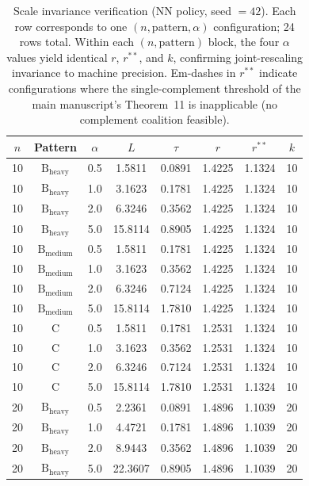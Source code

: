 \documentclass[11pt]{article}
\begin{document}
\begin{table}[htbp]
\centering
\footnotesize
\caption{Scale invariance verification (NN policy, seed $=42$). Each row corresponds to one $(n,\text{pattern},\alpha)$ configuration; 24 rows total. Within each $(n,\text{pattern})$ block, the four $\alpha$ values yield identical $r$, $r^{\ast\ast}$, and $k$, confirming joint-rescaling invariance to machine precision. Em-dashes in $r^{\ast\ast}$ indicate configurations where the single-complement threshold of the main manuscript's Theorem~11 is inapplicable (no complement coalition feasible).}
\label{tab:scale-invariance}
\begin{tabular}{@{}cccccccc@{}}
\toprule
$n$ & Pattern & $\alpha$ & $L$ & $\tau$ & $r$ & $r^{\ast\ast}$ & $k$ \\
\midrule
10 & $\text{B}_{\text{heavy}}$ & 0.5 & 1.5811 & 0.0891 & 1.4225 & 1.1324 & 10 \\
10 & $\text{B}_{\text{heavy}}$ & 1.0 & 3.1623 & 0.1781 & 1.4225 & 1.1324 & 10 \\
10 & $\text{B}_{\text{heavy}}$ & 2.0 & 6.3246 & 0.3562 & 1.4225 & 1.1324 & 10 \\
10 & $\text{B}_{\text{heavy}}$ & 5.0 & 15.8114 & 0.8905 & 1.4225 & 1.1324 & 10 \\
\midrule
10 & $\text{B}_{\text{medium}}$ & 0.5 & 1.5811 & 0.1781 & 1.4225 & 1.1324 & 10 \\
10 & $\text{B}_{\text{medium}}$ & 1.0 & 3.1623 & 0.3562 & 1.4225 & 1.1324 & 10 \\
10 & $\text{B}_{\text{medium}}$ & 2.0 & 6.3246 & 0.7124 & 1.4225 & 1.1324 & 10 \\
10 & $\text{B}_{\text{medium}}$ & 5.0 & 15.8114 & 1.7810 & 1.4225 & 1.1324 & 10 \\
\midrule
10 & C & 0.5 & 1.5811 & 0.1781 & 1.2531 & 1.1324 & 10 \\
10 & C & 1.0 & 3.1623 & 0.3562 & 1.2531 & 1.1324 & 10 \\
10 & C & 2.0 & 6.3246 & 0.7124 & 1.2531 & 1.1324 & 10 \\
10 & C & 5.0 & 15.8114 & 1.7810 & 1.2531 & 1.1324 & 10 \\
\midrule
20 & $\text{B}_{\text{heavy}}$ & 0.5 & 2.2361 & 0.0891 & 1.4896 & 1.1039 & 20 \\
20 & $\text{B}_{\text{heavy}}$ & 1.0 & 4.4721 & 0.1781 & 1.4896 & 1.1039 & 20 \\
20 & $\text{B}_{\text{heavy}}$ & 2.0 & 8.9443 & 0.3562 & 1.4896 & 1.1039 & 20 \\
20 & $\text{B}_{\text{heavy}}$ & 5.0 & 22.3607 & 0.8905 & 1.4896 & 1.1039 & 20 \\

\end{tabular}
\end{table}
\end{document}
